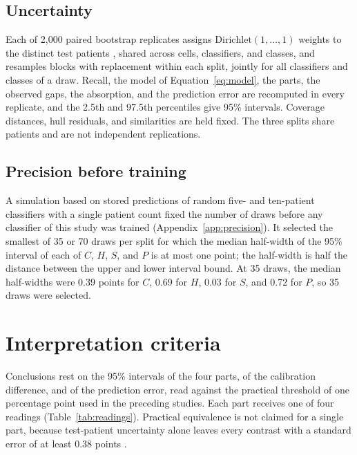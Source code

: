 \documentclass[11pt]{article}
\begin{document}
\subsection{Uncertainty}
\label{sec:uncertainty}
Each of 2,000 paired bootstrap replicates assigns $\mathrm{Dirichlet}(1,\ldots,1)$ weights to the distinct test patients \citep{rubin1981bayesian}, shared across cells, classifiers, and classes, and resamples blocks with replacement within each split, jointly for all classifiers and classes of a draw. Recall, the model of Equation~\eqref{eq:model}, the parts, the observed gaps, the absorption, and the prediction error are recomputed in every replicate, and the 2.5th and 97.5th percentiles give 95\% intervals. Coverage distances, hull residuals, and similarities are held fixed. The three splits share patients and are not independent replications.

\subsection{Precision before training}
\label{sec:precision}
A simulation based on stored predictions of random five- and ten-patient classifiers with a single patient count \citep{queisler2026effectiveSupport} fixed the number of draws before any classifier of this study was trained (Appendix~\ref{app:precision}). It selected the smallest of 35 or 70 draws per split for which the median half-width of the 95\% interval of each of $C$, $H$, $S$, and $P$ is at most one point; the half-width is half the distance between the upper and lower interval bound. At 35 draws, the median half-widths were 0.39 points for $C$, 0.69 for $H$, 0.03 for $S$, and 0.72 for $P$, so 35 draws were selected.

\section{Interpretation criteria}
\label{sec:interpretation}
Conclusions rest on the 95\% intervals of the four parts, of the calibration difference, and of the prediction error, read against the practical threshold of one percentage point used in the preceding studies. Each part receives one of four readings (Table~\ref{tab:readings}). Practical equivalence is not claimed for a single part, because test-patient uncertainty alone leaves every contrast with a standard error of at least 0.38 points \citep{queisler2026coverageSimilarity}.
\end{document}
